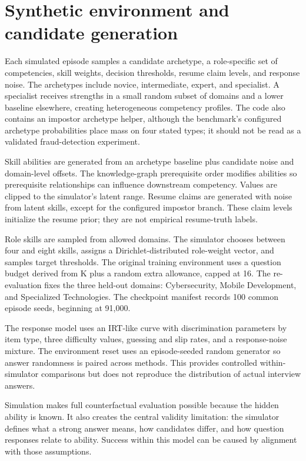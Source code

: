 \documentclass{ieeeaccess}
\begin{document}
\section{Synthetic environment and candidate generation}

Each simulated episode samples a candidate archetype, a role-specific set of competencies, skill weights, decision thresholds, resume claim levels, and response noise. The archetypes include novice, intermediate, expert, and specialist. A specialist receives strengths in a small random subset of domains and a lower baseline elsewhere, creating heterogeneous competency profiles. The code also contains an impostor archetype helper, although the benchmark's configured archetype probabilities place mass on four stated types; it should not be read as a validated fraud-detection experiment.

Skill abilities are generated from an archetype baseline plus candidate noise and domain-level offsets. The knowledge-graph prerequisite order modifies abilities so prerequisite relationships can influence downstream competency. Values are clipped to the simulator's latent range. Resume claims are generated with noise from latent skills, except for the configured impostor branch. These claim levels initialize the resume prior; they are not empirical resume-truth labels.

Role skills are sampled from allowed domains. The simulator chooses between four and eight skills, assigns a Dirichlet-distributed role-weight vector, and samples target thresholds. The original training environment uses a question budget derived from K plus a random extra allowance, capped at 16. The re-evaluation fixes the three held-out domains: Cybersecurity, Mobile Development, and Specialized Technologies. The checkpoint manifest records 100 common episode seeds, beginning at 91,000.

The response model uses an IRT-like curve with discrimination parameters by item type, three difficulty values, guessing and slip rates, and a response-noise mixture. The environment reset uses an episode-seeded random generator so answer randomness is paired across methods. This provides controlled within-simulator comparisons but does not reproduce the distribution of actual interview answers.

Simulation makes full counterfactual evaluation possible because the hidden ability is known. It also creates the central validity limitation: the simulator defines what a strong answer means, how candidates differ, and how question responses relate to ability. Success within this model can be caused by alignment with those assumptions.
\end{document}

